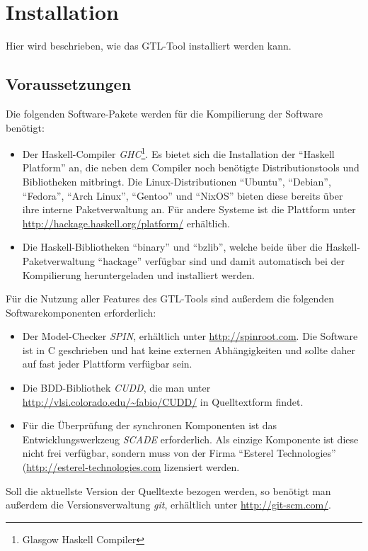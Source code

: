 \chapter{Installation}
Hier wird beschrieben, wie das GTL-Tool installiert werden kann.
\section{Voraussetzungen}
Die folgenden Software-Pakete werden für die Kompilierung der Software benötigt:
\begin{itemize}
\item Der Haskell-Compiler \emph{GHC}\footnote{Glasgow Haskell Compiler}.
  Es bietet sich die Installation der "`Haskell Platform"' an, die neben dem Compiler noch benötigte Distributionstools und Bibliotheken mitbringt.
  Die Linux-Distributionen "`Ubuntu"', "`Debian"', "`Fedora"', "`Arch Linux"', "`Gentoo"' und "`NixOS"' bieten diese bereits über ihre interne Paketverwaltung an.
  Für andere Systeme ist die Plattform unter \url{http://hackage.haskell.org/platform/} erhältlich.
\item Die Haskell-Bibliotheken "`binary"' und "`bzlib"', welche beide über die Haskell-Pa\-ket\-ver\-wal\-tung "`hackage"' verfügbar sind und damit automatisch bei der Kompilierung heruntergeladen und installiert werden.
\end{itemize}
Für die Nutzung aller Features des GTL-Tools sind außerdem die folgenden Softwarekomponenten erforderlich:
\begin{itemize}
\item Der Model-Checker \emph{SPIN}, erhältlich unter \url{http://spinroot.com}.
  Die Software ist in C geschrieben und hat keine externen Abhängigkeiten und sollte daher auf fast jeder Plattform verfügbar sein.
\item Die BDD-Bibliothek \emph{CUDD}, die man unter \url{http://vlsi.colorado.edu/~fabio/CUDD/} in Quelltextform findet.
\item Für die Überprüfung der synchronen Komponenten ist das Entwicklungswerkzeug \emph{SCADE} erforderlich.
  Als einzige Komponente ist diese nicht frei verfügbar, sondern muss von der Firma "`Esterel Technologies"' (\url{http://esterel-technologies.com} lizensiert werden.
\end{itemize}
Soll die aktuellste Version der Quelltexte bezogen werden, so benötigt man außerdem die Versionsverwaltung \emph{git}, erhältlich unter \url{http://git-scm.com/}.
